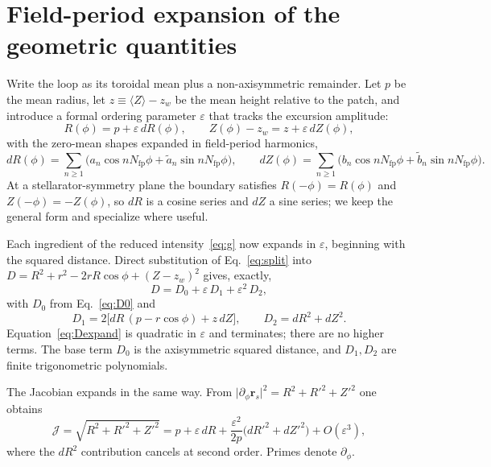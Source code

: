 \documentclass[11pt]{article}
\newcommand{\rs}{\bm{r}_s}
\newcommand{\Nfp}{N_{\mathrm{fp}}}
\newcommand{\eps}{\varepsilon}
\newcommand{\Order}[1]{O(\eps^{#1})}
\begin{document}
\section{Field-period expansion of the geometric quantities}
\label{sec:expansion}

Write the loop as its toroidal mean plus a non-axisymmetric remainder. Let $p$ be the mean radius, let $z\equiv\langle Z\rangle-z_w$ be the mean height relative to the patch, and introduce a formal ordering parameter $\eps$ that tracks the excursion amplitude:
\begin{equation}
R(\phi)=p+\eps\,dR(\phi),\qquad Z(\phi)-z_w=z+\eps\,dZ(\phi),
\label{eq:split}
\end{equation}
with the zero-mean shapes expanded in field-period harmonics,
\begin{equation}
dR(\phi)=\sum_{n\ge1}\big(a_n\cos n\Nfp\phi+\tilde a_n\sin n\Nfp\phi\big),\qquad
dZ(\phi)=\sum_{n\ge1}\big(b_n\cos n\Nfp\phi+\tilde b_n\sin n\Nfp\phi\big).
\label{eq:harmonics}
\end{equation}
At a stellarator-symmetry plane the boundary satisfies $R(-\phi)=R(\phi)$ and $Z(-\phi)=-Z(\phi)$, so $dR$ is a cosine series and $dZ$ a sine series; we keep the general form and specialize where useful.

Each ingredient of the reduced intensity~\eqref{eq:g} now expands in $\eps$, beginning with the squared distance. Direct substitution of Eq.~\eqref{eq:split} into $D=R^2+r^2-2rR\cos\phi+(Z-z_w)^2$ gives, exactly,
\begin{equation}
D=D_0+\eps\,D_1+\eps^2\,D_2,
\label{eq:Dexpand}
\end{equation}
with $D_0$ from Eq.~\eqref{eq:D0} and
\begin{equation}
D_1=2\big[dR\,(p-r\cos\phi)+z\,dZ\big],\qquad
D_2=dR^2+dZ^2.
\label{eq:D1D2}
\end{equation}
Equation~\eqref{eq:Dexpand} is quadratic in $\eps$ and terminates; there are no higher terms. The base term $D_0$ is the axisymmetric squared distance, and $D_1,D_2$ are finite trigonometric polynomials.

The Jacobian expands in the same way. From $\lvert\partial_\phi\rs\rvert^2=R^2+R'^2+Z'^2$ one obtains
\begin{equation}
\mathcal{J}=\sqrt{R^2+R'^2+Z'^2}
=p+\eps\,dR+\frac{\eps^2}{2p}\big(dR'^2+dZ'^2\big)+\Order{3},
\label{eq:Jexpand}
\end{equation}
where the $dR^2$ contribution cancels at second order. Primes denote $\partial_\phi$.
\end{document}

